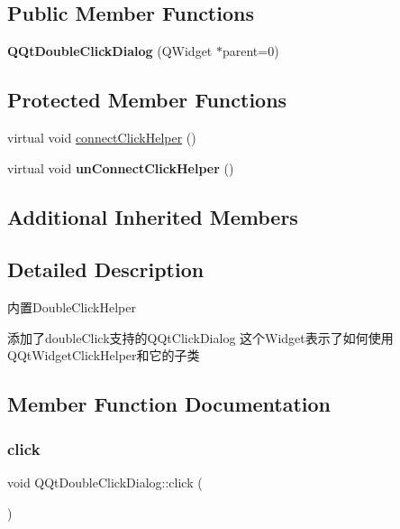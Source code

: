 \subsection*{Public Member Functions}
\begin{DoxyCompactItemize}
\item 
\mbox{\label{class_q_qt_double_click_dialog_a55da4b7b0790552602b9fe3cbe6881ea}} 
{\bfseries Q\+Qt\+Double\+Click\+Dialog} (Q\+Widget $\ast$parent=0)
\end{DoxyCompactItemize}
\subsection*{Protected Member Functions}
\begin{DoxyCompactItemize}
\item 
virtual void \mbox{\hyperlink{class_q_qt_double_click_dialog_aeb530bd68159ea4833076b450cb5f4ca}{connect\+Click\+Helper}} ()
\item 
\mbox{\label{class_q_qt_double_click_dialog_a6ab028c8f44ea559663597d913efc90d}} 
virtual void {\bfseries un\+Connect\+Click\+Helper} ()
\end{DoxyCompactItemize}
\subsection*{Additional Inherited Members}


\subsection{Detailed Description}
内置\+Double\+Click\+Helper

添加了double\+Click支持的\+Q\+Qt\+Click\+Dialog 这个\+Widget表示了如何使用\+Q\+Qt\+Widget\+Click\+Helper和它的子类 

\subsection{Member Function Documentation}
\mbox{\label{class_q_qt_double_click_dialog_a3461712a18712567e94b8bdf35af3f98}} 
\subsubsection{\texorpdfstring{click}{click}}
{\footnotesize\ttfamily void Q\+Qt\+Double\+Click\+Dialog\+::click (\begin{DoxyParamCaption}{ }\end{DoxyParamCaption})\hspace{0.3cm}{\ttfamily [signal]}}

